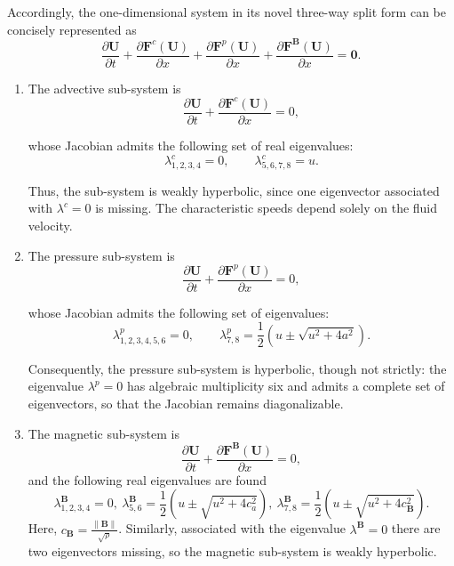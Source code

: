 \documentclass[a4paper,fleqn]{cas-sc}
\theoremstyle{definition}
\theoremstyle{remark}
\begin{document}
Accordingly, the one-dimensional system in its novel three-way split form can be concisely represented as
\begin{equation}
    \frac{\partial \mathbf{U}}{\partial t} + \frac{\partial \mathbf{F}^c(\mathbf{U})}{\partial x} + \frac{\partial \mathbf{F}^p(\mathbf{U})}{\partial x} + \frac{\partial \mathbf{F}^{\mathbf{B}}(\mathbf{U})}{\partial x} = \mathbf{0}.
\end{equation}

\begin{enumerate}
\item The advective sub-system is
\begin{equation}
\label{equ:advective sub-system}
\frac{\partial \mathbf U}{\partial t}
+ \frac{\partial \mathbf F^c(\mathbf U)}{\partial x}
= 0,
\end{equation}

whose Jacobian admits the following set of real eigenvalues:
\begin{equation}
\lambda^c_{1,2,3,4} = 0,
\qquad
\lambda^c_{5,6,7,8} = u .
\end{equation}

Thus, the sub-system is weakly hyperbolic, since one eigenvector associated with
$\lambda^c = 0$ is missing. The characteristic speeds depend solely on the fluid velocity.

\item The pressure sub-system is
\begin{equation}
\frac{\partial \mathbf U}{\partial t}
+ \frac{\partial \mathbf F^{p}(\mathbf U)}{\partial x}
= 0,
\label{equ:pressure sub-system}
\end{equation}

whose Jacobian admits the following set of eigenvalues:
\begin{equation}
\lambda^{p}_{1,2,3,4,5,6} = 0,
\qquad
\lambda^{p}_{7,8}
= \frac{1}{2} (u \pm \sqrt{u^2 +  4a^2}).
\end{equation}

Consequently, the pressure sub-system is hyperbolic, though not strictly: the
eigenvalue $\lambda^p = 0$ has algebraic multiplicity six and admits a complete set of
eigenvectors, so that the Jacobian remains diagonalizable.



\item The magnetic sub-system is
\begin{equation}
\frac{\partial \mathbf U}{\partial t}
+ \frac{\partial \mathbf F^{\mathbf{B}}(\mathbf U)}{\partial x}
= 0,
\label{equ:magnective sub-system}
\end{equation}
and the following real eigenvalues are found
\begin{equation}
    \lambda^\mathbf{B}_{1,2,3,4} = 0, \ 
    \lambda^\mathbf{B}_{5,6} = \frac{1}{2}\left( u \pm \sqrt{u^2 + 4 c_a^2} \right), \ 
\lambda^\mathbf{B}_{7,8} =     \frac{1}{2}\left( u \pm \sqrt{u^2 + 4 c_\mathbf{B}^2} \right).
\end{equation}
Here, $c_\mathbf{B} = \frac{\lVert \mathbf{B} \rVert}{\sqrt{\rho}}$. Similarly, associated with the eigenvalue $\lambda^{\mathbf B}=0$ there are two
eigenvectors missing, so the magnetic sub-system is weakly hyperbolic.
\end{enumerate}
\end{document}
